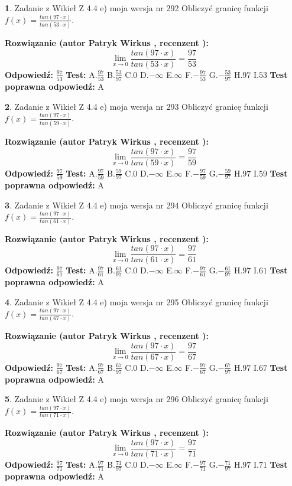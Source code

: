 \documentclass[12pt, a4paper]{article}
\theoremstyle{definition} %
\newtheorem{zad}{}
\newcommand{\zadStart}[1]{\begin{zad}#1\newline}
\newcommand{\zadStop}{\end{zad}}
\newcommand{\rozwStart}[2]{\noindent \textbf{Rozwiązanie (autor #1 , recenzent #2): }\newline}
\newcommand{\rozwStop}{\newline}
\newcommand{\odpStart}{\noindent \textbf{Odpowiedź:}\newline}
\newcommand{\odpStop}{\newline}
\newcommand{\testStart}{\noindent \textbf{Test:}\newline}
\newcommand{\testStop}{\newline}
\newcommand{\kluczStart}{\noindent \textbf{Test poprawna odpowiedź:}\newline}
\newcommand{\kluczStop}{\newline}
\begin{document}
\zadStart{Zadanie z Wikieł Z 4.4 e) moja wersja nr 292}
Obliczyć granicę funkcji $f(x)=\frac{tan(97\cdot x)}{tan(53\cdot x)}$.
\zadStop
\rozwStart{Patryk Wirkus}{}
$$\lim\limits_{x\to 0}\frac{tan(97\cdot x)}{tan(53\cdot x)}=
\frac{97}{53}$$
\rozwStop
\odpStart
$\frac{97}{53}$
\odpStop
\testStart
A.$\frac{97}{53}$
B.$\frac{53}{97}$
C.$0$
D.$-\infty$
E.$\infty$
F.$-\frac{97}{53}$
G.$-\frac{53}{97}$
H.$97$
I.$53$
\testStop
\kluczStart
A
\kluczStop



\zadStart{Zadanie z Wikieł Z 4.4 e) moja wersja nr 293}
Obliczyć granicę funkcji $f(x)=\frac{tan(97\cdot x)}{tan(59\cdot x)}$.
\zadStop
\rozwStart{Patryk Wirkus}{}
$$\lim\limits_{x\to 0}\frac{tan(97\cdot x)}{tan(59\cdot x)}=
\frac{97}{59}$$
\rozwStop
\odpStart
$\frac{97}{59}$
\odpStop
\testStart
A.$\frac{97}{59}$
B.$\frac{59}{97}$
C.$0$
D.$-\infty$
E.$\infty$
F.$-\frac{97}{59}$
G.$-\frac{59}{97}$
H.$97$
I.$59$
\testStop
\kluczStart
A
\kluczStop



\zadStart{Zadanie z Wikieł Z 4.4 e) moja wersja nr 294}
Obliczyć granicę funkcji $f(x)=\frac{tan(97\cdot x)}{tan(61\cdot x)}$.
\zadStop
\rozwStart{Patryk Wirkus}{}
$$\lim\limits_{x\to 0}\frac{tan(97\cdot x)}{tan(61\cdot x)}=
\frac{97}{61}$$
\rozwStop
\odpStart
$\frac{97}{61}$
\odpStop
\testStart
A.$\frac{97}{61}$
B.$\frac{61}{97}$
C.$0$
D.$-\infty$
E.$\infty$
F.$-\frac{97}{61}$
G.$-\frac{61}{97}$
H.$97$
I.$61$
\testStop
\kluczStart
A
\kluczStop



\zadStart{Zadanie z Wikieł Z 4.4 e) moja wersja nr 295}
Obliczyć granicę funkcji $f(x)=\frac{tan(97\cdot x)}{tan(67\cdot x)}$.
\zadStop
\rozwStart{Patryk Wirkus}{}
$$\lim\limits_{x\to 0}\frac{tan(97\cdot x)}{tan(67\cdot x)}=
\frac{97}{67}$$
\rozwStop
\odpStart
$\frac{97}{67}$
\odpStop
\testStart
A.$\frac{97}{67}$
B.$\frac{67}{97}$
C.$0$
D.$-\infty$
E.$\infty$
F.$-\frac{97}{67}$
G.$-\frac{67}{97}$
H.$97$
I.$67$
\testStop
\kluczStart
A
\kluczStop



\zadStart{Zadanie z Wikieł Z 4.4 e) moja wersja nr 296}
Obliczyć granicę funkcji $f(x)=\frac{tan(97\cdot x)}{tan(71\cdot x)}$.
\zadStop
\rozwStart{Patryk Wirkus}{}
$$\lim\limits_{x\to 0}\frac{tan(97\cdot x)}{tan(71\cdot x)}=
\frac{97}{71}$$
\rozwStop
\odpStart
$\frac{97}{71}$
\odpStop
\testStart
A.$\frac{97}{71}$
B.$\frac{71}{97}$
C.$0$
D.$-\infty$
E.$\infty$
F.$-\frac{97}{71}$
G.$-\frac{71}{97}$
H.$97$
I.$71$
\testStop
\kluczStart
A
\kluczStop
\end{document}
